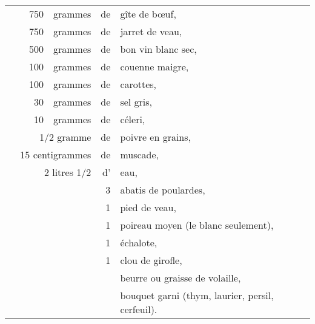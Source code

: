 \footnotesize
\begin{longtable}{rrrrrp{18em}}
 & \hspace{2em} &   750 & grammes & de & gîte de bœuf,                                                    \\
 & \hspace{2em} &   750 & grammes & de & jarret de veau,                                                  \\
 & \hspace{2em} &   500 & grammes & de & bon vin blanc sec,                                               \\
 & \hspace{2em} &   100 & grammes & de & couenne maigre,                                                  \\
 & \hspace{2em} &   100 & grammes & de & carottes,                                                        \\
 & \hspace{2em} &    30 & grammes & de & sel gris,                                                        \\
 & \hspace{2em} &    10 & grammes & de & céleri,                                                          \\
 & \multicolumn{3}{r}{1/2 gramme}      & de & poivre en grains,                                           \\
 & \multicolumn{3}{r}{15 centigrammes} & de & muscade,                                                    \\
 & \multicolumn{3}{r}{2 litres 1/2}    & d’ & eau,                                                        \\
 & \hspace{3em} &       &         &  3 & abatis de poulardes,                                             \\
 & \hspace{3em} &       &         &  1 & pied de veau,                                                    \\
 & \hspace{3em} &       &         &  1 & poireau moyen (le blanc seulement),                              \\
 & \hspace{3em} &       &         &  1 & échalote,                                                        \\
 & \hspace{3em} &       &         &  1 & clou de girofle,                                                 \\
 & \hspace{3em} &       &         &    & beurre ou graisse de volaille,                                   \\
 & \hspace{3em} &       &         &    & bouquet garni (thym, laurier, persil, cerfeuil).                 \\
\end{longtable}
\normalsize

